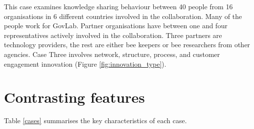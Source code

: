 This case examines knowledge sharing behaviour between 40 people from 16 organisations in 6 different countries involved in the collaboration. Many of the people work for GovLab. Partner organisations have between one and four representatives actively involved in the collaboration. Three partners are technology providers, the rest are either bee keepers or bee researchers from other agencies. Case Three involves network, structure, process, and customer engagement innovation (Figure \ref{fig:innovation_type}).

\section{Contrasting features}


Table \ref{cases} summarises the key characteristics of each case.\medskip

\begin{table}[]
	\small
	\centering
	\caption{Key characteristics of the cases recruited for this study}
	\label{cases}
\end{table}

